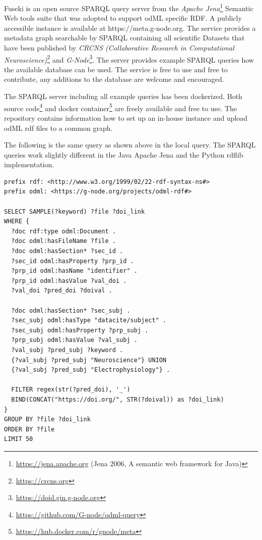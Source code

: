 \documentclass{article}
\begin{document}
Fuseki is an open source SPARQL query server from the \textit{Apache Jena}\footnote{\url{https://jena.apache.org} (Jena 2006, A semantic web framework for Java)} Semantic Web tools suite that was adopted to support odML specific RDF. A publicly accessible instance is available at https://meta.g-node.org. The service provides a metadata graph searchable by SPARQL containing all scientific Datasets that have been published by \textit{CRCNS (Collaborative Research in Computational Neuroscience)}\footnote{\url{https://crcns.org}} and \textit{G-Node}\footnote{\url{https://doid.gin.g-node.org}}. The server provides example SPARQL queries how the available database can be used. The service is free to use and free to contribute, any additions to the database are welcome and encouraged.

The SPARQL server including all example queries has been dockerized. Both source code\footnote{\url{https://github.com/G-node/odml-query}} and docker container\footnote{\url{https://hub.docker.com/r/gnode/meta}} are freely available and free to use. The repository contains information how to set up an in-house instance and upload odML rdf files to a common graph.


The following is the same query as shown above in the local query. The SPARQL queries work slightly different in the Java Apache Jena and the Python rdflib implementation.

\begin{lstlisting}[label=lst:query_server, caption=Example query server, basicstyle=\small]
prefix rdf: <http://www.w3.org/1999/02/22-rdf-syntax-ns#>
prefix odml: <https://g-node.org/projects/odml-rdf#>

SELECT SAMPLE(?keyword) ?file ?doi_link
WHERE {
  ?doc rdf:type odml:Document .
  ?doc odml:hasFileName ?file .
  ?doc odml:hasSection* ?sec_id .
  ?sec_id odml:hasProperty ?prp_id .
  ?prp_id odml:hasName "identifier" .
  ?prp_id odml:hasValue ?val_doi .
  ?val_doi ?pred_doi ?doival .

  ?doc odml:hasSection* ?sec_subj .
  ?sec_subj odml:hasType "datacite/subject" .
  ?sec_subj odml:hasProperty ?prp_subj .
  ?prp_subj odml:hasValue ?val_subj .
  ?val_subj ?pred_subj ?keyword .
  {?val_subj ?pred_subj "Neuroscience"} UNION
  {?val_subj ?pred_subj "Electrophysiology"} .

  FILTER regex(str(?pred_doi), '_')
  BIND(CONCAT("https://doi.org/", STR(?doival)) as ?doi_link)
}
GROUP BY ?file ?doi_link
ORDER BY ?file
LIMIT 50
\end{lstlisting}
\end{document}

